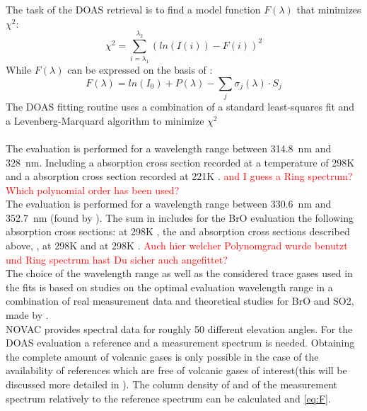 The task of the DOAS retrieval is to find a model function $F \left(\lambda\right)$ that minimizes $\chi^2$:
\begin{equation}
\chi^2 = \sum_{i=\lambda_1}^{\lambda_2}\left(ln(I(i))-F(i)\right)^2
\label{eq:Chi}
\end{equation}
While $F\left(\lambda\right)$ can be expressed on the basis of :
\begin{equation}
F\left(\lambda\right) = ln\left(I_0 \right) + P \left(\lambda\right)-
\sum_{j}\sigma_j \left(\lambda\right) \cdot S_j
\label{eq:F}
\end{equation}
The DOAS fitting routine uses a combination of a standard least-squares fit and a Levenberg-Marquard algorithm to minimize $\chi^2$\\
\\
The  evaluation is performed for a wavelength range between 314.8~nm and 328~nm. Including a  absorption cross section recorded at a temperature of 298K \citep{vandaele2009fourier} and a   absorption cross section recorded at 221K \citep{burrows1999atmospheric}. \textcolor{red}{and I guess a Ring spectrum?
	Which polynomial order has been used?}\\
The   evaluation is performed for a wavelength range between 330.6~nm and 352.7~nm (found by \citet{vogel2011volcanic}). The sum in  includes for the BrO evaluation the following absorption cross sections:
  at 298K \citep{fleischmann2004new}, the  and   absorption cross sections described above,  \citep{hermans2003absorption},   at 298K \citep{vandaele1998measurements} and   at 298K \citep{meller2000temperature}. \textcolor{red}{Auch hier welcher Polynomgrad wurde benutzt und Ring spectrum hast Du sicher auch angefittet?}\\
%
The choice of the wavelength range as well as the considered trace gases used in the fits is based on studies on the optimal evaluation wavelength range in a combination of real measurement data and theoretical studies for BrO and SO2, made by \citet{vogel2011volcanic}.\\
%
NOVAC provides spectral data for roughly 50 different elevation angles. For the DOAS evaluation a reference and a measurement spectrum is needed. Obtaining the complete amount of volcanic gases is only possible in the case of the availability of references which are free of volcanic gases of interest(this will be discussed more detailed in ). The column density of    and  of the measurement spectrum relatively to the reference spectrum can be calculated  and \ref{eq:F}. \\
